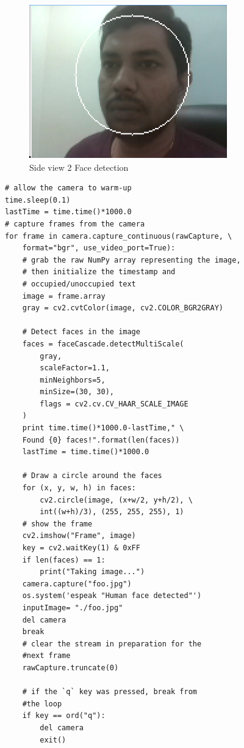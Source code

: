 \begin{figure}[htb]
  \centering
  \includegraphics[width=\columnwidth]{images/Face-detect-sideview2.png}
  \caption{Side view 2 Face detection}\label{F:sideview2}
\end{figure}


\begin{verbatim}
# allow the camera to warm-up
time.sleep(0.1)
lastTime = time.time()*1000.0
# capture frames from the camera
for frame in camera.capture_continuous(rawCapture, \ 
	format="bgr", use_video_port=True):
	# grab the raw NumPy array representing the image, 
	# then initialize the timestamp and 
	# occupied/unoccupied text
    image = frame.array
    gray = cv2.cvtColor(image, cv2.COLOR_BGR2GRAY)
    
    # Detect faces in the image
    faces = faceCascade.detectMultiScale(
    	gray,
    	scaleFactor=1.1,
    	minNeighbors=5,
    	minSize=(30, 30),
    	flags = cv2.cv.CV_HAAR_SCALE_IMAGE
    )
    print time.time()*1000.0-lastTime," \
    Found {0} faces!".format(len(faces))
    lastTime = time.time()*1000.0

    # Draw a circle around the faces
    for (x, y, w, h) in faces:
        cv2.circle(image, (x+w/2, y+h/2), \
        int((w+h)/3), (255, 255, 255), 1)
    # show the frame
    cv2.imshow("Frame", image)
    key = cv2.waitKey(1) & 0xFF
    if len(faces) == 1:
        print("Taking image...")
	camera.capture("foo.jpg")
	os.system('espeak "Human face detected"')
	inputImage= "./foo.jpg"
	del camera
	break 
	# clear the stream in preparation for the 
	#next frame
    rawCapture.truncate(0)
    
	# if the `q` key was pressed, break from 
	#the loop
    if key == ord("q"):
        del camera
        exit()
\end{verbatim}


